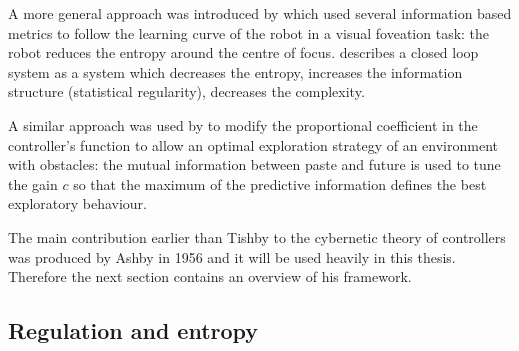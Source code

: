 A more general approach was introduced by \citet{LungarellaInformation} which
used several information based metrics to follow the learning curve of the robot
in a visual foveation task: the robot reduces the entropy around the centre of focus.
\citet{LungarellaInformation} describes a closed loop system as a system which
decreases the entropy, increases the information structure (statistical regularity),
decreases the complexity.

A similar approach was used by \citet{Ay2008:PredInformation} to modify the proportional
coefficient in the controller's function to allow an optimal exploration strategy
of an environment with obstacles: the mutual information between paste and future
is used to tune the gain $c$ so that the maximum of the predictive information defines the best exploratory
behaviour.

The main contribution earlier than Tishby to the cybernetic theory of controllers
was produced by Ashby in 1956 and it will be used heavily in this thesis.
Therefore the next section contains an overview of his framework.

\subsection{Regulation and entropy \label{Appendix:Ashby}}

